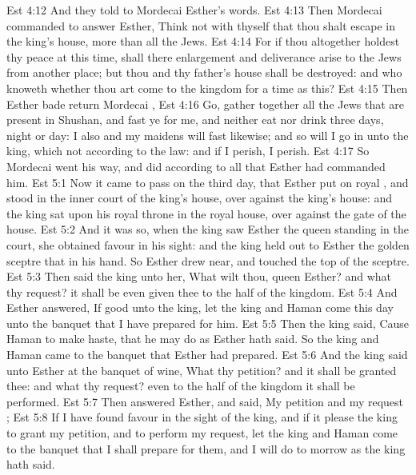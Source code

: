 \vs Est 4:12 And they told to Mordecai Esther's words.
\vs Est 4:13 Then Mordecai commanded to answer Esther, Think not with thyself that thou shalt escape in the king's house, more than all the Jews.
\vs Est 4:14 For if thou altogether holdest thy peace at this time,  shall there enlargement and deliverance arise to the Jews from another place; but thou and thy father's house shall be destroyed: and who knoweth whether thou art come to the kingdom for  a time as this?
\vs Est 4:15 Then Esther bade  return Mordecai ,
\vs Est 4:16 Go, gather together all the Jews that are present in Shushan, and fast ye for me, and neither eat nor drink three days, night or day: I also and my maidens will fast likewise; and so will I go in unto the king, which  not according to the law: and if I perish, I perish.
\vs Est 4:17 So Mordecai went his way, and did according to all that Esther had commanded him.
\vs Est 5:1 Now it came to pass on the third day, that Esther put on  royal , and stood in the inner court of the king's house, over against the king's house: and the king sat upon his royal throne in the royal house, over against the gate of the house.
\vs Est 5:2 And it was so, when the king saw Esther the queen standing in the court,  she obtained favour in his sight: and the king held out to Esther the golden sceptre that  in his hand. So Esther drew near, and touched the top of the sceptre.
\vs Est 5:3 Then said the king unto her, What wilt thou, queen Esther? and what  thy request? it shall be even given thee to the half of the kingdom.
\vs Est 5:4 And Esther answered, If  good unto the king, let the king and Haman come this day unto the banquet that I have prepared for him.
\vs Est 5:5 Then the king said, Cause Haman to make haste, that he may do as Esther hath said. So the king and Haman came to the banquet that Esther had prepared.
\vs Est 5:6 And the king said unto Esther at the banquet of wine, What  thy petition? and it shall be granted thee: and what  thy request? even to the half of the kingdom it shall be performed.
\vs Est 5:7 Then answered Esther, and said, My petition and my request ;
\vs Est 5:8 If I have found favour in the sight of the king, and if it please the king to grant my petition, and to perform my request, let the king and Haman come to the banquet that I shall prepare for them, and I will do to morrow as the king hath said.
